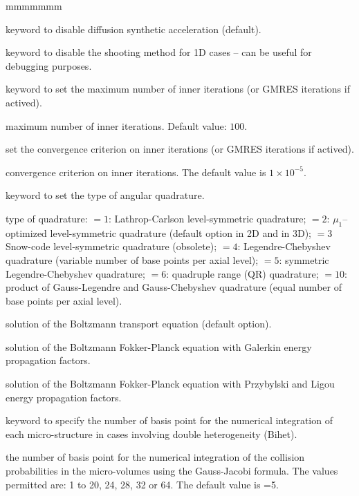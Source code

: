 \begin{ListeDeDescription}{mmmmmmm}
\item[\moc{NDSA}] keyword to disable diffusion synthetic acceleration (default).

\item[\moc{NSHT}] keyword to disable the shooting method for 1D cases -- can be useful for debugging purposes.

\item[\moc{MAXI}] keyword to set the maximum number of inner iterations (or GMRES iterations if actived).
\item[\dusa{maxi}] maximum number of inner iterations. Default value: $100$.

\item[\moc{EPSI}] set the convergence criterion on inner iterations (or GMRES iterations if actived).
\item[\dusa{epsi}] convergence criterion on inner iterations. The default value is $1\times 10^{-5}$.
\item[\moc{QUAD}] keyword to set the type of angular quadrature.

\item[\dusa{iquad}] type of quadrature: $=1$: Lathrop-Carlson level-symmetric quadrature;
$=2$: $\mu_1$--optimi\-zed level-symmetric quadrature (default option in 2D and in 3D); $=3$ Snow-code level-symmetric quadrature
(obsolete); $=4$: Legendre-Chebyshev quadrature (variable number of base points
per axial level); $=5$: symmetric Legendre-Chebyshev quadrature; $=6$: quadruple range (QR)
quadrature;\cite{quadrupole} $=10$: product of Gauss-Legendre and Gauss-Chebyshev quadrature (equal
number of base points per axial level).

\item[\moc{BTE}] solution of the Boltzmann transport equation (default option).

\item[\moc{BFPG}] solution of the Boltzmann Fokker-Planck equation with Galerkin energy propagation factors.

\item[\moc{BFPL}] solution of the Boltzmann Fokker-Planck equation with Przybylski and Ligou energy propagation factors.\cite{ligou}

\item[\moc{QUAB}] keyword to specify the number of basis point for the
numerical integration of each micro-structure in cases involving double
heterogeneity (Bihet).

\item[\dusa{iquab}] the number of basis point for the numerical integration of
the collision probabilities in the micro-volumes using the  Gauss-Jacobi
formula. The values permitted are: 1 to 20, 24, 28, 32 or  64. The default value
is =5.


\end{ListeDeDescription}
